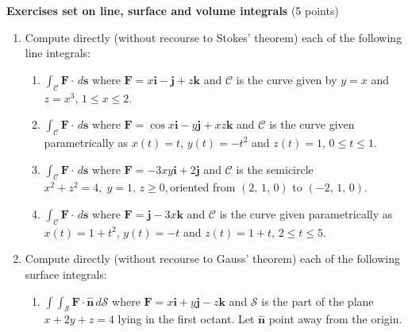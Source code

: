 \documentclass[fleqn]{article}
\begin{document}
\begin{enumerate}
    
  \end{enumerate}
  
  \textbf{Exercises set on line, surface and volume integrals} (5 points)
  \begin{enumerate}

    \item Compute directly (without recourse to Stokes' theorem) each of the following line integrals:
    
      \begin{enumerate}
        \item $\int_{\mathcal{C}}\mathbf{F\cdot }\, d\mathbf{s}$ where $\mathbf{F}=x \mathbf{i}-\mathbf{j}+z\mathbf{k}$ and $\mathcal{C}$ is the curve given by $y=x$ and $z=x^{3}$, $1\leq x\leq 2$.
        
        \item $\int_{\mathcal{C}}\mathbf{F\cdot }\, d\mathbf{s}$ where $\mathbf{F}=\cos x\mathbf{i}-y\mathbf{j}+xz\mathbf{k}$ and $\mathcal{C}$ is the curve given parametrically as $x\left( t\right) =t$, $y\left(t\right) =-t^{2}$ and $z\left( t\right) =1$, $0\leq t\leq 1$.
        
        \item $\int_{\mathcal{C}}\mathbf{F\cdot }\, d\mathbf{s}$ where $\mathbf{F}=-3xy \mathbf{i}+2\mathbf{j}$ and $\mathcal{C}$ is the semicircle $x^{2}+z^{2}=4,\;y=1,\,z\geq 0,$oriented from $\left( 2,\,1,\,0\right) $ to $\left( -2,\,1,\,0\right) .$
        
        \item $\int_{\mathcal{C}}\mathbf{F\cdot }\, d\mathbf{s}$ where $\mathbf{F}= \mathbf{j}-3x\mathbf{k}$ and $\mathcal{C}$ is the curve given parametrically as $x\left( t\right) =1+t^{2}$, $y\left( t\right) =-t$ and $ z\left( t\right) =1+t$, $2\leq t\leq 5$.
      \end{enumerate}
    
    
    \item Compute directly (without recourse to Gauss' theorem) each of the following surface integrals:
    
      \begin{enumerate}
        \item $\int \! \int_{\mathcal{S}}\mathbf{F\cdot \hat{n}}\,d\mathcal{S}$ where $\mathbf{F}=x\mathbf{i}+y\mathbf{j}-z\mathbf{k}$ and $\mathcal{S}$ is the part of the plane $x+2y+z=4$ lying in the first octant.  Let $\mathbf{\hat{n}}$ point away from the origin.
        

\end{enumerate}
\end{enumerate}
\end{document}

